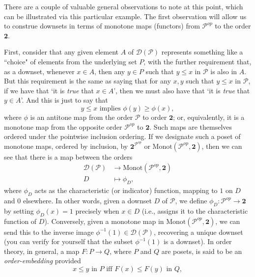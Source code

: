 \documentclass[11pt]{book}
\theoremstyle{definition}
\theoremstyle{definition}
\theoremstyle{definition}
\theoremstyle{theorem}
\theoremstyle{definition}
\begin{document}
There are a couple of valuable general observations to note at this point, which can be illustrated via this particular example. The first observation will allow us to construe downsets in terms of monotone maps (functors) from $\mathcal{P}^{op}$ to the order $\textbf{2}$.\par 
First, consider that any given element $A$ of $\mathcal{D}(\mathcal{P})$ represents something like a ``choice" of elements from the underlying set $P$, with the further requirement that, as a downset, whenever $x \in A$, then any $y \in P$ such that $y \leq x$ in $\mathcal{P}$ is also in $A$. But this requirement is the same as saying that for any $x, y$ such that $y \leq x$ in $\mathcal{P}$, if we have that `it is \textit{true} that $x \in A$', then we must also have that `it is \textit{true} that $y \in A$'. And this is just to say that 
\begin{equation*}
y \leq x \text{ implies } \phi(y) \geq \phi(x),
\end{equation*}  
where $\phi$ is an antitone map from the order $\mathcal{P}$ to order $\textbf{2}$; or, equivalently, it is a monotone map from the opposite order $\mathcal{P}^{op}$ to $\textbf{2}$. Such maps are themselves ordered under the pointwise inclusion ordering. If we designate such a poset of monotone maps, ordered by inclusion, by $\textbf{2}^{\mathcal{P}^{op}}$ or $\text{Monot}(\mathcal{P}^{op}, \textbf{2})$, then we can see that there is a map between the orders 
\begin{align*}
\mathcal{D}(\mathcal{P}) & \rightarrow \text{Monot}(\mathcal{P}^{op}, \textbf{2}) \\ 
D & \mapsto \phi_D,
\end{align*} 
where $\phi_D$ acts as the characteristic (or indicator) function, mapping to $1$ on $D$ and $0$ elsewhere. In other words, given a downset $D$ of $\mathcal{P}$, we define $\phi_D: \mathcal{P}^{op} \rightarrow \textbf{2}$ by setting $\phi_D(x) = 1$ precisely when $x \in D$ (i.e., assigns it to the characteristic function of $D$). Conversely, given a monotone map in $\text{Monot}(\mathcal{P}^{op}, \textbf{2})$, we can send this to the inverse image $\phi^{-1}(1) \in \mathcal{D}(\mathcal{P})$, recovering a unique downset (you can verify for yourself that the subset $\phi^{-1}(1)$ is a downset). In order theory, in general, a map $F: P \rightarrow Q$, where $P$ and $Q$ are posets, is said to be an \textit{order-embedding}  provided 
\begin{equation*}
x \leq y \text{ in } P \text{ iff } F(x) \leq F(y) \text{ in } Q,
\end{equation*}
\end{document}
